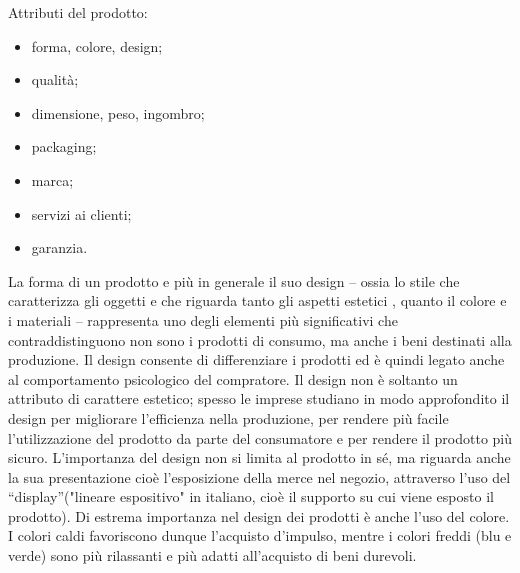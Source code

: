 Attributi del prodotto:
\begin{itemize}
	\item forma, colore, design;
	\item qualità;
	\item dimensione, peso, ingombro;
	\item packaging;
	\item marca;
	\item servizi ai clienti;
	\item garanzia.
\end{itemize}
La forma di un prodotto e più in generale il suo design – ossia lo stile che caratterizza gli oggetti e che riguarda tanto gli aspetti estetici , quanto il colore e i materiali – rappresenta uno degli elementi più significativi che contraddistinguono non sono i prodotti di consumo, ma anche i beni destinati alla produzione. \newline
Il design consente di differenziare i prodotti ed è quindi legato anche al comportamento psicologico del compratore. \newline
Il design non è soltanto un attributo di carattere estetico; spesso le imprese studiano in modo approfondito il design per migliorare l’efficienza nella produzione, per rendere più facile l’utilizzazione del prodotto da parte del consumatore e per rendere il prodotto più sicuro. \newline
L’importanza del design non si limita al prodotto in sé, ma riguarda anche la sua presentazione cioè l’esposizione della merce nel negozio, attraverso l’uso del “display”("lineare espositivo"  in italiano, cioè il supporto su cui viene esposto il prodotto). \newline
Di estrema importanza nel design dei prodotti è anche l’uso del colore. I colori caldi favoriscono dunque l’acquisto d’impulso, mentre i colori freddi (blu e verde) sono più rilassanti e più adatti all’acquisto di beni durevoli. 

